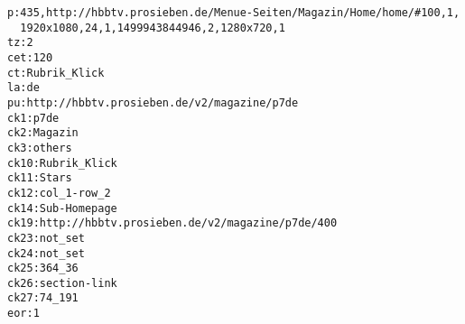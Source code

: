 \begin{appendix}
\vspace{1cm}

\begin{lstlisting}
p:435,http://hbbtv.prosieben.de/Menue-Seiten/Magazin/Home/home/#100,1,
  1920x1080,24,1,1499943844946,2,1280x720,1
tz:2
cet:120
ct:Rubrik_Klick
la:de
pu:http://hbbtv.prosieben.de/v2/magazine/p7de
ck1:p7de
ck2:Magazin
ck3:others
ck10:Rubrik_Klick
ck11:Stars
ck12:col_1-row_2
ck14:Sub-Homepage
ck19:http://hbbtv.prosieben.de/v2/magazine/p7de/400
ck23:not_set
ck24:not_set
ck25:364_36
ck26:section-link
ck27:74_191
eor:1
\end{lstlisting}

\end{appendix}

\endinput
